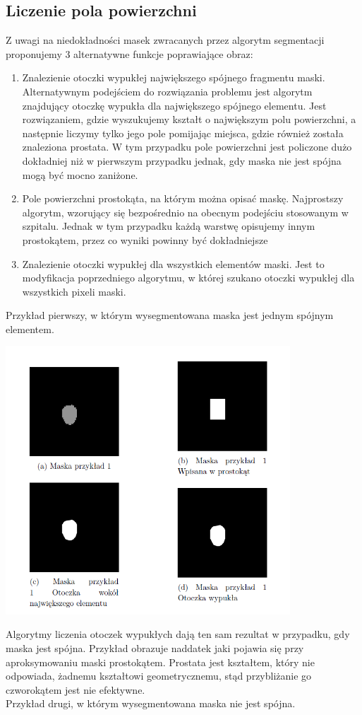 \documentclass[a4paper,11pt,twoside]{report}
\theoremstyle{definition}
\begin{document}
\subsection{Liczenie pola powierzchni}
Z uwagi na niedokładności masek zwracanych przez algorytm segmentacji proponujemy 3 alternatywne funkcje poprawiające obraz:
\begin{enumerate}
\item Znalezienie otoczki wypukłej największego spójnego fragmentu maski. Alternatywnym podejściem do rozwiązania problemu jest algorytm znajdujący otoczkę wypukła dla największego spójnego elementu. Jest rozwiązaniem, gdzie wyszukujemy kształt o największym polu powierzchni, a następnie liczymy tylko jego pole pomijając miejsca, gdzie również została znaleziona prostata. W tym przypadku pole powierzchni jest policzone dużo dokładniej niż w pierwszym przypadku jednak, gdy maska nie jest spójna mogą być mocno zaniżone. 
\item Pole powierzchni prostokąta, na którym można opisać maskę. Najprostszy algorytm, wzorujący się bezpośrednio na obecnym podejściu stosowanym w szpitalu. Jednak w tym przypadku każdą warstwę opisujemy innym prostokątem, przez co wyniki powinny być dokładniejsze
\item Znalezienie otoczki wypukłej dla wszystkich elementów maski. Jest to modyfikacja poprzedniego algorytmu, w której szukano otoczki wypukłej dla wszystkich pixeli maski.
\end{enumerate}

Przykład pierwszy, w którym wysegmentowana maska jest jednym spójnym elementem. 

\begin{minipage}[H]{\linewidth}
	\centering
	\includegraphics[width=0.8\textwidth]{Mask/segmentacja1.png}
	\label{przy1}
\end{minipage}
Algorytmy liczenia otoczek wypukłych dają ten sam rezultat w przypadku, gdy maska jest spójna. Przykład obrazuje naddatek jaki pojawia się przy aproksymowaniu maski prostokątem. Prostata jest kształtem, który nie odpowiada, żadnemu kształtowi geometrycznemu, stąd przybliżanie go czworokątem jest nie efektywne.
\\
Przykład drugi, w którym wysegmentowana maska nie jest spójna. 
\end{document}
